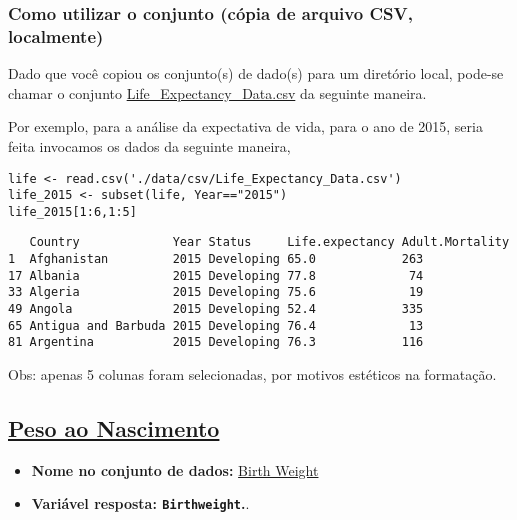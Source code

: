 \documentclass[12pt]{article}
\begin{document}
\subsubsection{Como utilizar o conjunto (cópia de arquivo CSV, localmente)}
\label{sec:orgf6510b3}
Dado que você copiou os conjunto(s) de dado(s) para um diretório
local, pode-se chamar o conjunto \href{https://drive.google.com/file/d/1nUnOwgAcWIqoyG0P5\_wnlh1wPxxSUqv5/view}{Life\_Expectancy\_Data.csv} da seguinte maneira.

Por exemplo, para a análise da expectativa de vida, para o ano de
2015, seria feita invocamos os dados da seguinte maneira,

\begin{verbatim}
life <- read.csv('./data/csv/Life_Expectancy_Data.csv')
life_2015 <- subset(life, Year=="2015")
life_2015[1:6,1:5] 
\end{verbatim}

\begin{verbatim}
   Country             Year Status     Life.expectancy Adult.Mortality
1  Afghanistan         2015 Developing 65.0            263            
17 Albania             2015 Developing 77.8             74            
33 Algeria             2015 Developing 75.6             19            
49 Angola              2015 Developing 52.4            335            
65 Antigua and Barbuda 2015 Developing 76.4             13            
81 Argentina           2015 Developing 76.3            116            
\end{verbatim}


Obs: apenas 5 colunas foram selecionadas, por motivos estéticos na formatação.
\clearpage

\subsection{\href{https://www.sheffield.ac.uk/mash/statistics/datasets}{Peso ao Nascimento}}
\label{sec:orgde1797d}
\begin{itemize}
\item \textbf{Nome no conjunto de dados:} \href{https://drive.google.com/file/d/1xv2lCPsj04FjGPQ\_BgPS9mrTIjBcyHQk/view?usp=sharing}{Birth Weight}
\item \textbf{Variável resposta: \texttt{Birthweight}.}.
\end{itemize}
\end{document}
